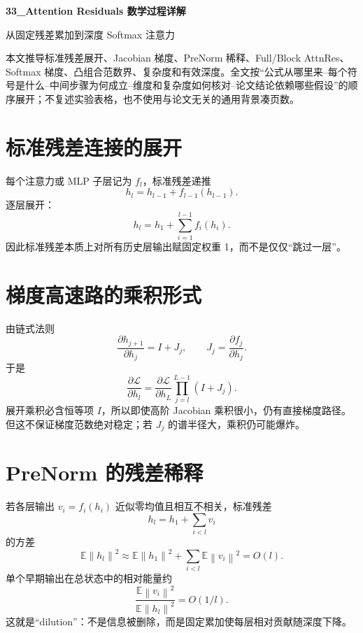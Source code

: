 \documentclass[UTF8,12pt,a4paper,fontset=none]{ctexart}
\numberwithin{equation}{section}
\newcommand{\E}{\mathbb{E}}
\newcommand{\Loss}{\mathcal{L}}
\newcommand{\norm}[1]{\left\lVert #1\right\rVert}
\begin{document}
\begin{center}
{\LARGE\bfseries 33\_Attention Residuals 数学过程详解}\par
\vspace{0.35em}
{\large 从固定残差累加到深度 Softmax 注意力}
\end{center}
\vspace{0.45em}
\begin{keybox}[本文只处理真正需要推导的部分]
本文推导标准残差展开、Jacobian 梯度、PreNorm 稀释、Full/Block AttnRes、Softmax 梯度、凸组合范数界、复杂度和有效深度。全文按“公式从哪里来--每个符号是什么--中间步骤为何成立--维度和复杂度如何核对--论文结论依赖哪些假设”的顺序展开；不复述实验表格，也不使用与论文无关的通用背景凑页数。
\end{keybox}
\tableofcontents
\newpage

\section{标准残差连接的展开}
每个注意力或 MLP 子层记为 $f_l$，标准残差递推
\begin{equation}
 h_l=h_{l-1}+f_{l-1}(h_{l-1}).
\end{equation}
逐层展开：
\begin{equation}
 \boxed{h_l=h_1+\sum_{i=1}^{l-1}f_i(h_i)}.
\end{equation}
因此标准残差本质上对所有历史层输出赋固定权重 1，而不是仅仅“跳过一层”。

\section{梯度高速路的乘积形式}
由链式法则
\begin{equation}
 \frac{\partial h_{j+1}}{\partial h_j}=I+J_j,
 \qquad J_j=\frac{\partial f_j}{\partial h_j}.
\end{equation}
于是
\begin{equation}
 \boxed{
 \frac{\partial\Loss}{\partial h_l}
 =\frac{\partial\Loss}{\partial h_L}
 \prod_{j=l}^{L-1}(I+J_j)}.
\end{equation}
展开乘积必含恒等项 $I$，所以即使高阶 Jacobian 乘积很小，仍有直接梯度路径。但这不保证梯度范数绝对稳定；若 $J_j$ 的谱半径大，乘积仍可能爆炸。

\section{PreNorm 的残差稀释}
若各层输出 $v_i=f_i(h_i)$ 近似零均值且相互不相关，标准残差
\begin{equation}
 h_l=h_1+\sum_{i<l}v_i
\end{equation}
的方差
\begin{equation}
 \E\norm{h_l}^2\approx\E\norm{h_1}^2+
 \sum_{i<l}\E\norm{v_i}^2=O(l).
\end{equation}
单个早期输出在总状态中的相对能量约
\begin{equation}
 \frac{\E\norm{v_i}^2}{\E\norm{h_l}^2}=O(1/l).
\end{equation}
这就是“dilution”：不是信息被删除，而是固定累加使每层相对贡献随深度下降。
\end{document}
